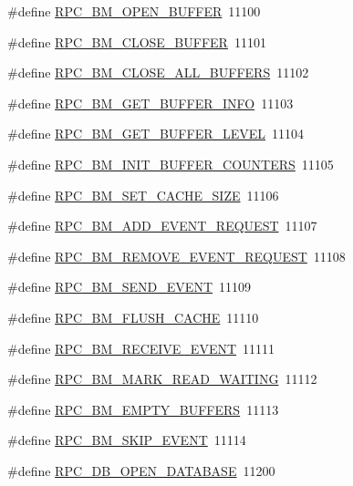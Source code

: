 \begin{DoxyCompactItemize}
\item 
\#define \hyperlink{group__mrpcdefineh_gabb4377471c0fcc7fc12c20be2a8936a2}{RPC\_\-BM\_\-OPEN\_\-BUFFER}~11100
\item 
\#define \hyperlink{group__mrpcdefineh_ga6bcbf5868fd271b48e01dfc56037365a}{RPC\_\-BM\_\-CLOSE\_\-BUFFER}~11101
\item 
\#define \hyperlink{group__mrpcdefineh_ga8b215c45660e1188647a692b5bf4f331}{RPC\_\-BM\_\-CLOSE\_\-ALL\_\-BUFFERS}~11102
\item 
\#define \hyperlink{group__mrpcdefineh_ga3086fb047ff3c4156f9403acff41536b}{RPC\_\-BM\_\-GET\_\-BUFFER\_\-INFO}~11103
\item 
\#define \hyperlink{group__mrpcdefineh_gab72ded79eeb603a774cabd09a05e6041}{RPC\_\-BM\_\-GET\_\-BUFFER\_\-LEVEL}~11104
\item 
\#define \hyperlink{group__mrpcdefineh_gadeeb32ed05aac659594408527ebb40d0}{RPC\_\-BM\_\-INIT\_\-BUFFER\_\-COUNTERS}~11105
\item 
\#define \hyperlink{group__mrpcdefineh_ga7467f8651a147cf7a9551892496b958e}{RPC\_\-BM\_\-SET\_\-CACHE\_\-SIZE}~11106
\item 
\#define \hyperlink{group__mrpcdefineh_ga08d9a543a5cb2a44825514fe3d4bcdba}{RPC\_\-BM\_\-ADD\_\-EVENT\_\-REQUEST}~11107
\item 
\#define \hyperlink{group__mrpcdefineh_ga3955d6212a5b08beaae12ee07aecd088}{RPC\_\-BM\_\-REMOVE\_\-EVENT\_\-REQUEST}~11108
\item 
\#define \hyperlink{group__mrpcdefineh_ga1e44640630aa4a9a60e344cde968587b}{RPC\_\-BM\_\-SEND\_\-EVENT}~11109
\item 
\#define \hyperlink{group__mrpcdefineh_gaea9459a45b400149d4e5910a5da5e52c}{RPC\_\-BM\_\-FLUSH\_\-CACHE}~11110
\item 
\#define \hyperlink{group__mrpcdefineh_gad0d0e115e7026f808f8df526ff5c77ee}{RPC\_\-BM\_\-RECEIVE\_\-EVENT}~11111
\item 
\#define \hyperlink{group__mrpcdefineh_ga1990e62135e38d4070c1eb69cbf7a291}{RPC\_\-BM\_\-MARK\_\-READ\_\-WAITING}~11112
\item 
\#define \hyperlink{group__mrpcdefineh_gabda66a6b961c81625a3185c68b2673f9}{RPC\_\-BM\_\-EMPTY\_\-BUFFERS}~11113
\item 
\#define \hyperlink{group__mrpcdefineh_gada948fec43038394de1d672926fa354e}{RPC\_\-BM\_\-SKIP\_\-EVENT}~11114
\item 
\#define \hyperlink{group__mrpcdefineh_gaabff12e1182d8f6484ba9b0bdd0fa06e}{RPC\_\-DB\_\-OPEN\_\-DATABASE}~11200
\item 

\end{DoxyCompactItemize}
